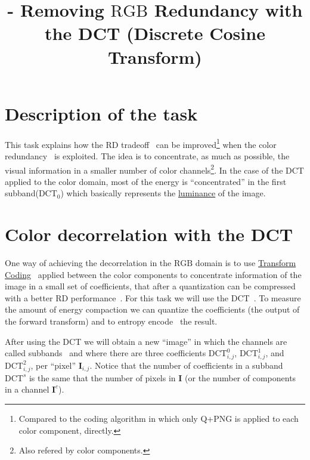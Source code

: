 

\title{\SM{} - Removing $\text{RGB}$ Redundancy with the DCT (Discrete Cosine Transform)}

\maketitle

\tableofcontents

\section{Description of the task}

This task explains how the RD
tradeoff~\cite{vruiz__information_theory} can be
improved\footnote{Compared to the coding algorithm in which only Q+PNG
is applied to each color component, directly.} when the color
redundancy~\cite{vruiz__visual_redundancy} is exploited. The idea is
to concentrate, as much as possible, the visual information in a
smaller number of color channels\footnote{Also refered by color
components.}. In the case of the DCT applied to the color domain, most
of the energy is ``concentrated'' in the first subband($\text{DCT}_0$)
which basically represents the
\href{https://en.wikipedia.org/wiki/Luminance}{luminance} of the
image.



\section{Color decorrelation with the DCT}

One way of achieving the decorrelation in the $\text{RGB}$ domain is
to use
\href{https://vicente-gonzalez-ruiz.github.io/transform_coding/}{Transform
  Coding}~\cite{vruiz__transform_coding} applied between the color
components to concentrate information of the image in a small set of
coefficients, that after a quantization can be compressed with a
better RD performance~\cite{vruiz__information_theory}. For this task
we will use the DCT~\cite{vruiz__DCT}. To measure the amount of energy
compaction we can quantize the coefficients (the output of the forward
transform) and to entropy encode~\cite{vruiz__information_theory} the
result.

After using the DCT we will obtain a new ``image'' in which the
channels are called subbands~\cite{vruiz__transform_coding} and
where there are three coefficients $\text{DCT}^0_{i,j}$,
$\text{DCT}^1_{i,j}$, and $\text{DCT}^2_{i,j}$, per ``pixel''
$\mathbf{I}_{i,j}$. Notice that the number of coefficients in a
subband $\text{DCT}^s$ is the same that the number of pixels in
$\mathbf{I}$ (or the number of components in a channel
$\mathbf{I}^c$).


